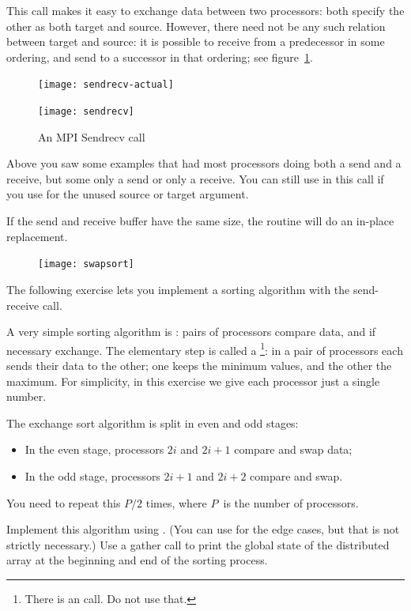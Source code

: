 This call makes it easy to exchange data between two processors: both
specify the other as both target and source. However, there need not
be any such relation between target and source: it is possible to
receive from a predecessor in some ordering, and send to a successor
in that ordering; see figure~\ref{fig:sendrecv}.
\begin{figure}[ht]
\begin{lulu}
    \texttt{[image: sendrecv-actual]}
\end{lulu}
\begin{notlulu}
    \texttt{[image: sendrecv]}
\end{notlulu}
  \caption{An MPI Sendrecv call}
  \label{fig:sendrecv}
\end{figure}
Above you saw some examples that had most processors doing both a send and
a receive, but some only a send or only a receive. You can still use
 in this call if you use  for
the unused source or target argument.

If the send and receive buffer have the same size, the routine
 will do an in-place replacement.

\begin{figure}
  \texttt{[image: swapsort]}
\end{figure}
%
The following exercise lets you implement a sorting algorithm with the send-receive call.
\begin{exercise}
  \label{ex:exchangesort}
  A very simple sorting algorithm is :
  pairs of processors compare data, and if necessary exchange. The
  elementary step is called a \footnote
  {There is an  call. Do not use that.}: in a pair
  of processors each sends their data to the other; one keeps the
  minimum values, and the other the maximum.
  For simplicity, in this exercise we give each processor just a single number.

  The exchange sort algorithm is split in even and odd stages:
  \begin{itemize}
  \item In the even stage, processors $2i$ and $2i+1$ compare and swap data;
  \item In the odd stage, processors $2i+1$ and $2i+2$ compare and swap.
  \end{itemize}
  You need to repeat this $P/2$ times, where $P$~is the number of processors.

  Implement this algorithm using . (You can use
   for the edge cases, but that is not strictly necessary.)
  Use a gather call to print the global state of the distributed array
  at the beginning and end of the sorting process.
\end{exercise}

